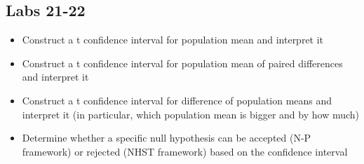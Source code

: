 \documentclass[11pt]{article} %
\begin{document}
\subsection{Labs 21-22}

\begin{itemize}
\item Construct a t confidence interval for population mean and interpret it
\item Construct a t confidence interval for population mean of paired differences and interpret it
\item Construct a t confidence interval for difference of population means and interpret it (in particular, which population mean is bigger and by how much)
\item Determine whether a specific null hypothesis can be accepted (N-P framework) or rejected (NHST framework) based on the confidence interval
\end{itemize}
\end{document}
